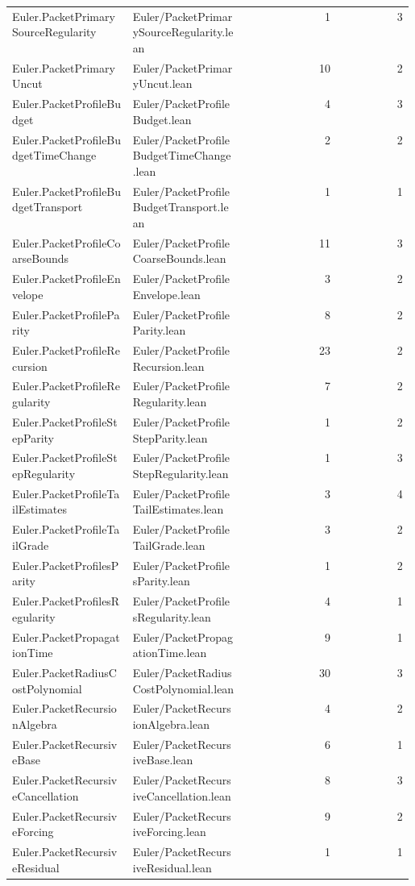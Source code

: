 \begin{longtable}{p{0.30\linewidth}p{0.28\linewidth}rr}
Euler.PacketPrimarySourceRegularity & Euler/PacketPrimarySourceRegularity.lean & 1 & 3\\
Euler.PacketPrimaryUncut & Euler/PacketPrimaryUncut.lean & 10 & 2\\
Euler.PacketProfileBudget & Euler/PacketProfileBudget.lean & 4 & 3\\
Euler.PacketProfileBudgetTimeChange & Euler/PacketProfileBudgetTimeChange.lean & 2 & 2\\
Euler.PacketProfileBudgetTransport & Euler/PacketProfileBudgetTransport.lean & 1 & 1\\
Euler.PacketProfileCoarseBounds & Euler/PacketProfileCoarseBounds.lean & 11 & 3\\
Euler.PacketProfileEnvelope & Euler/PacketProfileEnvelope.lean & 3 & 2\\
Euler.PacketProfileParity & Euler/PacketProfileParity.lean & 8 & 2\\
Euler.PacketProfileRecursion & Euler/PacketProfileRecursion.lean & 23 & 2\\
Euler.PacketProfileRegularity & Euler/PacketProfileRegularity.lean & 7 & 2\\
Euler.PacketProfileStepParity & Euler/PacketProfileStepParity.lean & 1 & 2\\
Euler.PacketProfileStepRegularity & Euler/PacketProfileStepRegularity.lean & 1 & 3\\
Euler.PacketProfileTailEstimates & Euler/PacketProfileTailEstimates.lean & 3 & 4\\
Euler.PacketProfileTailGrade & Euler/PacketProfileTailGrade.lean & 3 & 2\\
Euler.PacketProfilesParity & Euler/PacketProfilesParity.lean & 1 & 2\\
Euler.PacketProfilesRegularity & Euler/PacketProfilesRegularity.lean & 4 & 1\\
Euler.PacketPropagationTime & Euler/PacketPropagationTime.lean & 9 & 1\\
Euler.PacketRadiusCostPolynomial & Euler/PacketRadiusCostPolynomial.lean & 30 & 3\\
Euler.PacketRecursionAlgebra & Euler/PacketRecursionAlgebra.lean & 4 & 2\\
Euler.PacketRecursiveBase & Euler/PacketRecursiveBase.lean & 6 & 1\\
Euler.PacketRecursiveCancellation & Euler/PacketRecursiveCancellation.lean & 8 & 3\\
Euler.PacketRecursiveForcing & Euler/PacketRecursiveForcing.lean & 9 & 2\\
Euler.PacketRecursiveResidual & Euler/PacketRecursiveResidual.lean & 1 & 1\\

\end{longtable}
